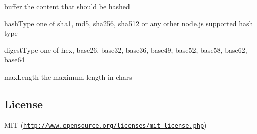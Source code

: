 \begin{DoxyItemize}
\item {\ttfamily buffer} the content that should be hashed
\item {\ttfamily hash\+Type} one of {\ttfamily sha1}, {\ttfamily md5}, {\ttfamily sha256}, {\ttfamily sha512} or any other node.\+js supported hash type
\item {\ttfamily digest\+Type} one of {\ttfamily hex}, {\ttfamily base26}, {\ttfamily base32}, {\ttfamily base36}, {\ttfamily base49}, {\ttfamily base52}, {\ttfamily base58}, {\ttfamily base62}, {\ttfamily base64}
\item {\ttfamily max\+Length} the maximum length in chars
\end{DoxyItemize}

\subsection*{License}

M\+IT (\href{http://www.opensource.org/licenses/mit-license.php}{\tt http\+://www.\+opensource.\+org/licenses/mit-\/license.\+php}) 